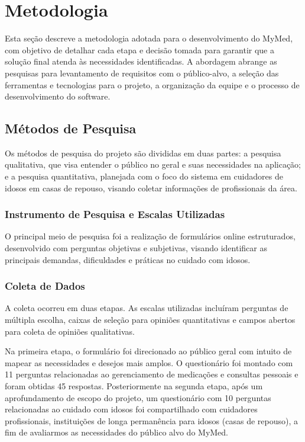 \documentclass[
	article,			%
	12pt,				%
	oneside,			%
	a4paper,			%
    BIBLATEX,           %
	english,			%
	brazil,				%
	sumario=tradicional
	]{abntex2}
\newcommand\nomeprojeto{MyMed}
\begin{document}
\section{Metodologia}

Esta seção descreve a metodologia adotada para o desenvolvimento do \nomeprojeto, com objetivo de detalhar cada etapa e decisão tomada para garantir que a solução final atenda às necessidades identificadas. A abordagem abrange as pesquisas para levantamento de requisitos com o público-alvo, a seleção das ferramentas e tecnologias para o projeto, a organização da equipe e o processo de desenvolvimento do software.

\subsection{Métodos de Pesquisa}

Os métodos de pesquisa do projeto são divididas em duas partes: a pesquisa qualitativa, que visa entender o público no geral e suas necessidades na aplicação; e a pesquisa quantitativa, planejada com o foco do sistema em cuidadores de idosos em casas de repouso, visando coletar informações de profissionais da área. 

\subsubsection{Instrumento de Pesquisa e Escalas Utilizadas}

O principal meio de pesquisa foi a realização de formulários online estruturados, desenvolvido com perguntas objetivas e subjetivas, visando identificar as principais demandas, dificuldades e práticas no cuidado com idosos.

\subsubsection{Coleta de Dados}

A coleta ocorreu em duas etapas. As escalas utilizadas incluíram perguntas de múltipla escolha, caixas de seleção para opiniões quantitativas e campos abertos para coleta de opiniões qualitativas. 

Na primeira etapa, o formulário foi direcionado ao público geral com intuito de mapear as necessidades e desejos mais amplos. O questionário foi montado com 11 perguntas relacionadas ao gerenciamento de medicações e consultas pessoais e foram obtidas 45 respostas. Posteriormente na segunda etapa, após um aprofundamento de escopo do projeto, um questionário com 10 perguntas relacionadas ao cuidado com idosos foi compartilhado com cuidadores profissionais, instituições de longa permanência para idosos (casas de repouso), a fim de avaliarmos as necessidades do público alvo do \nomeprojeto. 
\end{document}
